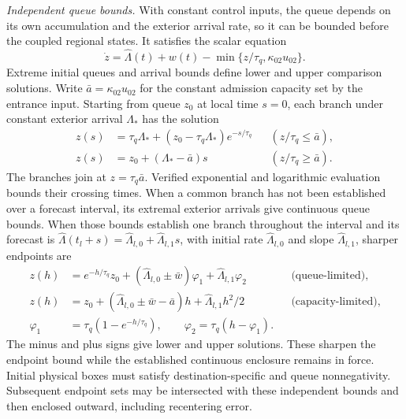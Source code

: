 \documentclass[final]{cas-sc}
\theoremstyle{definition}
\theoremstyle{plain}
\theoremstyle{definition}
\theoremstyle{plain}
\begin{document}
\medskip
\noindent\emph{Independent queue bounds.} With constant control inputs,
the queue depends on its own accumulation and the exterior arrival
rate, so it can be bounded before the coupled regional states. It
satisfies the scalar equation
\begin{equation}
\dot z=\widehat\Lambda(t)+w(t)-\min\{z/\tau_q,\kappa_{02}u_{02}\}.
\label{eq:structure-scalar-queue}
\end{equation}
Extreme initial queues and arrival bounds define lower and upper
comparison solutions. Write $\bar a=\kappa_{02}u_{02}$ for the constant
admission capacity set by the entrance input. Starting from queue $z_0$
at local time $s=0$, each branch under constant exterior arrival
$\Lambda_*$ has the solution
\begin{equation}
\begin{aligned}
z(s)&=\tau_q\Lambda_*+(z_0-\tau_q\Lambda_*)e^{-s/\tau_q}
&&(z/\tau_q\le\bar a),\\
z(s)&=z_0+(\Lambda_*-\bar a)s
&&(z/\tau_q\ge\bar a).
\end{aligned}
\label{eq:structure-queue-flows}
\end{equation}
The branches join at $z=\tau_q\bar a$. Verified exponential and
logarithmic evaluation bounds their crossing times. When a common
branch has not been established over a forecast interval, its extremal
exterior arrivals give continuous queue bounds. When those bounds
establish one branch throughout the interval and its forecast is
$\widehat\Lambda(t_l+s)=\widehat\Lambda_{l,0}+\widehat\Lambda_{l,1}s$,
with initial rate $\widehat\Lambda_{l,0}$ and slope
$\widehat\Lambda_{l,1}$, sharper endpoints are
\begin{equation}
\begin{aligned}
z(h)&=e^{-h/\tau_q}z_0+(\widehat\Lambda_{l,0}\pm\bar w)\varphi_1
+\widehat\Lambda_{l,1}\varphi_2
&&\text{(queue-limited)},\\
z(h)&=z_0+(\widehat\Lambda_{l,0}\pm\bar w-\bar a)h
+\widehat\Lambda_{l,1}h^2/2
&&\text{(capacity-limited)},\\
\varphi_1&=\tau_q(1-e^{-h/\tau_q}),\qquad
\varphi_2=\tau_q(h-\varphi_1).
\end{aligned}
\label{eq:structure-affine-queue}
\end{equation}
The minus and plus signs give lower and upper solutions. These sharpen
the endpoint bound while the established continuous enclosure remains
in force. Initial physical boxes must satisfy destination-specific and
queue nonnegativity. Subsequent endpoint sets may be intersected with
these independent bounds and then enclosed outward, including
recentering error.
\end{document}
